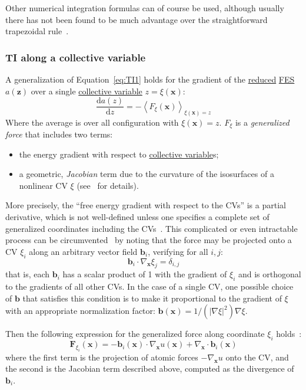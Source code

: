 \documentclass[9pt,review]{livecoms}
\newcommand{\vx}{\mathbf{x}}
\newcommand{\vz}{\mathbf{z}}
\newcommand{\vF}{\mathbf{F}}
\newcommand{\vb}{\mathbf{b}}
\begin{document}
Other numerical integration formulas can of course be used, although usually there has not been found to be much advantage over the straightforward trapezoidal rule~\cite{Paliwal_comparison_2011}.


\subsubsection{TI along a collective variable}

A generalization of Equation~\ref{eq:TI1} holds for the gradient of the \hyperlink{ref:reduced} {reduced} \hyperlink{ref:FES} {FES} $a(\vz)$ over a single \hyperlink{ref:CV} {collective variable} $z = \xi(\vx)$:
\begin{equation}
\frac{\mathrm{d} a(z)}{\mathrm{d} z} = - \left\langle F_\xi(\vx)  \right\rangle_{\xi(\vx) = z}
    \label{eq:TI_CV}
\end{equation}
Where the average is over all configuration with $\xi(\vx) = z$.
$F_\xi$ is a \textit{generalized force} that includes two terms:
\begin{itemize}
    \item the energy gradient with respect to \hyperlink{ref:CV} {collective variable}s;
    \item a geometric, \textit{Jacobian} term due to the curvature of the isosurfaces of a nonlinear CV $\xi$ (see~\cite{lelievre-rousset-stoltz-07-a, Henin2010a, Comer2015} for details).
\end{itemize}

More precisely, the ``free energy gradient with respect to the CVs'' is a partial derivative, which is not well-defined unless one specifies a complete set of generalized coordinates including the CVs~\cite{Henin2004}.
This complicated or even intractable process can be circumvented~\cite{denOtter2000, Ciccotti2005} by noting that the force may be projected onto a CV $\xi_i$ along an arbitrary vector field  $\vb_i$, verifying for all $i,j$:
\begin{equation}
    \vb_i \cdot \nabla_\vx \xi_j = \delta_{i,j}
\end{equation}
that is, each $\vb_i$ has a scalar product of 1 with the gradient of $\xi_i$ and is orthogonal to the gradients of all other CVs.
In the case of a single CV, one possible choice of $\vb$ that satisfies this condition is to make it proportional to the gradient of $\xi$ with an appropriate normalization factor:
$ \vb(\vx) = 1/(|\nabla \xi|^2) \nabla \xi$.

Then the following expression for the generalized force along coordinate $\xi_i$ holds~\cite{Ciccotti2005}:
\begin{equation}
\label{eq:TI_Ciccotti}
\vF_{\xi_i}(\vx) = - \vb_i(\vx) \cdot \nabla_\vx u(\vx) + \nabla_\vx \cdot \vb_i(\vx)
\end{equation}
where the first term is the projection of atomic forces $-\nabla_\vx u$ onto the CV, and the second is the Jacobian term described above, computed as the divergence of $\vb_i$.
\end{document}
